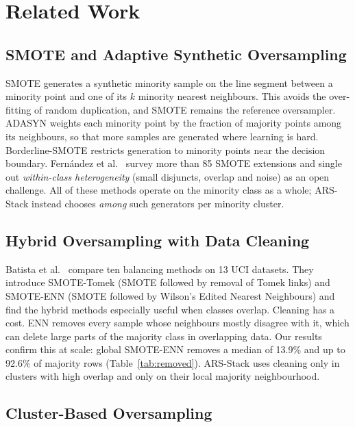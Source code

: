 \documentclass[11pt,a4paper]{article}
\begin{document}
\section{Related Work}\label{sec:related}

\subsection{SMOTE and Adaptive Synthetic Oversampling}

SMOTE \cite{chawla2002smote} generates a synthetic minority sample on the line segment between a minority point and one of its $k$ minority nearest neighbours. This avoids the over-fitting of random duplication, and SMOTE remains the reference oversampler. ADASYN \cite{he2008adasyn} weights each minority point by the fraction of majority points among its neighbours, so that more samples are generated where learning is hard. Borderline-SMOTE \cite{han2005borderline} restricts generation to minority points near the decision boundary. Fern{\'a}ndez et al.\ \cite{fernandez2018smote} survey more than 85 SMOTE extensions and single out \emph{within-class heterogeneity} (small disjuncts, overlap and noise) as an open challenge. All of these methods operate on the minority class as a whole; ARS-Stack instead chooses \emph{among} such generators per minority cluster.

\subsection{Hybrid Oversampling with Data Cleaning}

Batista et al.\ \cite{batista2004study} compare ten balancing methods on 13 UCI datasets. They introduce SMOTE-Tomek (SMOTE followed by removal of Tomek links) and SMOTE-ENN (SMOTE followed by Wilson's Edited Nearest Neighbours) and find the hybrid methods especially useful when classes overlap. Cleaning has a cost. ENN removes every sample whose neighbours mostly disagree with it, which can delete large parts of the majority class in overlapping data. Our results confirm this at scale: global SMOTE-ENN removes a median of 13.9\% and up to 92.6\% of majority rows (Table~\ref{tab:removed}). ARS-Stack uses cleaning only in clusters with high overlap and only on their local majority neighbourhood.

\subsection{Cluster-Based Oversampling}
\end{document}
